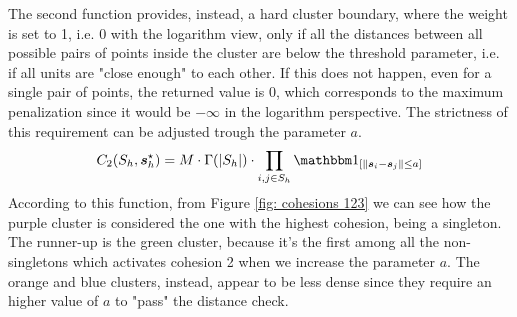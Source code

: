 \documentclass[12pt,	%
	a4paper,		%
	twoside,		%
	openright,		%
	titlepage,%
	]{book}
\theoremstyle{definition}
\begin{document}
The second function provides, instead, a hard cluster boundary, where the weight is set to 1, i.e. 0 with the logarithm view, only if all the distances between all possible pairs of points inside the cluster are below the threshold parameter, i.e. if all units are "close enough" to each other. If this does not happen, even for a single pair of points, the returned value is 0, which corresponds to the maximum penalization since it would be $-\infty$ in the logarithm perspective. The strictness of this requirement can be adjusted trough the parameter $a$.
\begin{equation}    
C_2(S_{h},\vec{s}_{h}^\star) = M \cdot \Gamma(|S_h|) \cdot \prod_{i,j \in S_h} \indicator{[\| \vec{s}_i - \vec{s}_j \| \leq a]}
\end{equation}
According to this function, from Figure \ref{fig: cohesions 123} we can see how the purple cluster is considered the one with the highest cohesion, being a singleton. The runner-up is the green cluster, because it's the first among all the non-singletons which activates cohesion 2 when we increase the parameter $a$. The orange and blue clusters, instead, appear to be less dense since they require an higher value of $a$ to "pass" the distance check. 
\end{document}
